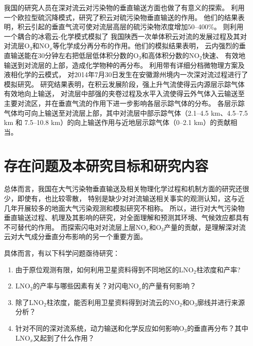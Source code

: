 我国的研究人员在深对流云对污染物的垂直输送方面也做了有意义的探索。
\citet{GaoHuiWang.1998}利用一个欧拉型硫沉降模式，研究了积云对硫污染物垂直输送的作用。
他们的结果表明，积云引起的垂直气流可使对流层高层的硫污染物浓度增加50--400\%。
\citet{LiBing.1999,LiBing.2001}则利用一个耦合的冰雹云-化学模式模拟了
我国陕西一次单体积云对流的发展过程及其对对流层O$_3$和NO$_x$等化学成分再分布的作用。他们的模拟结果表明，
云内强烈的垂直输送能在30分钟左右把低层低体积分数的O$_3$和高体积分数的NO$_2$快速、
有效地输送到对流层的上部，造成化学物种的再分布。
\citet{HuJiaYing.2019}利用带有详细分档微物理方案及液相化学的云模式，
对2014年7月30日发生在安徽滁州境内一次深对流过程进行了模拟研究。
研究结果表明，在积云发展阶段，强上升气流使得云内源层示踪气体有效地向上输送，
对流层中部强的夹卷过程及水平入流使得云外气体入云输送至主要对流区，并在垂直气流的作用下进一步影响各层示踪气体的分布。
各层示踪气体均可向上输送至对流层上部，其中对流层中部示踪气体（2.1--4.5 km、4.5--7.5 km 和 7.5--10.8 km）的向上输送作用与近地层示踪气体（0--2.1 km）的贡献相当。




\section{存在问题及本研究目标和研究内容}

总体而言，我国在大气污染物垂直输送及相关物理化学过程和机制方面的研究还很少，即使有，也比较零散，
特别是缺少对对流输送相关事实的观测认知，这与近几年开展较多的地面大气污染观测和模拟研究不相称。
所以，进行对大气污染物垂直输送过程、机理及其影响的研究，对全面理解和预测其环境、气候效应都具有不可替代的作用。
而探索闪电对对流层上层NO$_x$和O$_3$产量的贡献，是理解深对流云对大气成分垂直分布影响的另一个重要方面。

具体而言，有以下科学问题亟待研究：

\begin{enumerate}[label=（\arabic*）, labelindent=\parindent, leftmargin=0pt, widest=0, itemindent=*, topsep=0pt, partopsep=0pt, parsep=0pt]

\item 由于原位观测有限，如何利用卫星资料得到不同地区的LNO$_2$柱浓度和产率?

\item LNO$_2$的产率与哪些因素有关？对闪电NO$_x$的产量有何影响？

\item 除了LNO$_2$柱浓度，能否利用卫星资料得到对流云的NO$_2$和O$_3$廓线并进行来源分析？

\item 针对不同的深对流系统，动力输送和化学反应如何影响O$_3$的垂直再分布？其中LNO$_x$又起到了什么作用？

\end{enumerate}

